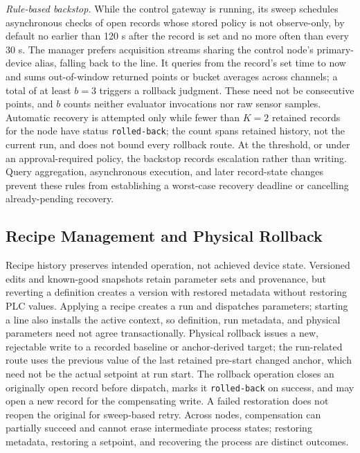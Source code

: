\emph{Rule-based backstop.} While the control gateway is running, its sweep
schedules asynchronous checks
of open records whose stored policy is not observe-only, by default no
earlier than 120 s after the record is set and no more often than every 30 s.
The manager prefers acquisition streams sharing the control node's
primary-device alias, falling back to the line. It queries from the record's
set time to now and sums out-of-window returned points or bucket averages
across channels; a total of at least $b=3$ triggers a rollback judgment.
These need not be consecutive points, and $b$ counts neither evaluator
invocations nor raw sensor samples. Automatic recovery is attempted only
while fewer than $K=2$ retained records for the node have status
\texttt{rolled-back}; the count spans retained history, not the current run,
and does not bound every rollback route. At the threshold, or under an
approval-required policy, the backstop records escalation rather than
writing. Query aggregation, asynchronous execution, and later record-state
changes prevent these rules from establishing a worst-case recovery deadline
or cancelling already-pending recovery.

\subsection{Recipe Management and Physical Rollback}
\label{sec:recipe}
Recipe history preserves intended operation, not achieved device state.
Versioned edits and known-good snapshots retain parameter sets and
provenance, but reverting a definition creates a version with restored
metadata without restoring PLC values. Applying a recipe creates a run and
dispatches parameters; starting a line also installs the active context, so
definition, run metadata, and physical parameters need not agree
transactionally. Physical rollback issues a new, rejectable write to a
recorded baseline or anchor-derived target; the run-related route uses the
previous value of the last retained pre-start changed anchor, which need not
be the actual setpoint at run start. The rollback operation closes an originally open record before dispatch,
marks it \texttt{rolled-back} on success, and may open a new record for the
compensating write. A failed restoration does not reopen the original for
sweep-based retry. Across nodes, compensation can partially succeed and
cannot erase intermediate process states; restoring metadata, restoring a
setpoint, and recovering the process are distinct outcomes.

